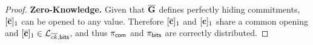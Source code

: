 \begin{proof}
{\bf Zero-Knowledge.} Given that $\overline{\mathbf{{G}}}$ defines perfectly hiding commitments, $[{\overline{\mathbf{c}}}]_1$ can be opened to any value. Therefore $[{\overline{\mathbf{c}}}]_1$ and $[\mathbf{c}]_1$ share a common opening and $[{\overline{\mathbf{c}}}]_1\in\mathcal{L}_{\overline{ck},\mathsf{bits}}$, and thus $\pi_{\mathsf{com}}$ and $\pi_{\mathsf{bits}}$ are correctly distributed.  
\end{proof}


